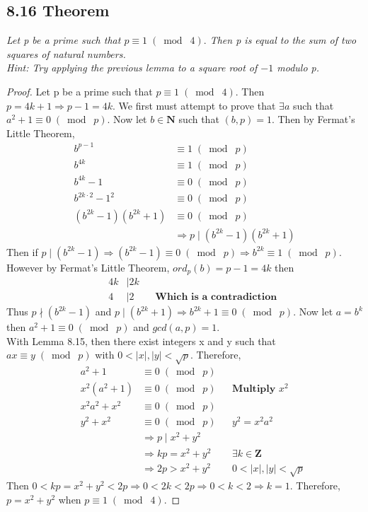 \documentclass{article}
\begin{document}
\subsection*{8.16 Theorem} 
\quad \textit{Let p be a prime such that $p \equiv 1 \;(\bmod\; 4).$ Then p is equal to the sum of two squares of natural numbers.}\\
\textit{Hint: Try applying the previous lemma to a square root of $-1$ modulo p.}

\begin{proof}
Let p be a prime such that $p \equiv 1 \;(\bmod\; 4)$. Then $p = 4k +1 \Longrightarrow p-1 = 4k$. We first must attempt to prove that $\exists a$ such that $a^2 + 1 \equiv 0 \;(\bmod\; p)$. Now let $b \in \mathbf{N}$ such that $(b,p) = 1$. Then by Fermat's Little Theorem,
\begin{align*}
    && b^{p-1}&\equiv 1 \;(\bmod\; p)&&\\
    && b^{4k}&\equiv 1 \;(\bmod\; p)&&\\
    && b^{4k} - 1 &\equiv 0 \;(\bmod\; p)&&\\
    && b^{2k\cdot 2} - 1^2 &\equiv 0 \;(\bmod\; p)&&\\
    && (b^{2k} - 1)(b^{2k} + 1) &\equiv 0 \;(\bmod\; p)&&\\
    && &\Longrightarrow p \mid (b^{2k} - 1)(b^{2k} + 1)&&
\end{align*}
Then if $p \mid (b^{2k} - 1) \Longrightarrow (b^{2k} - 1) \equiv 0 \;(\bmod\; p) \Longrightarrow b^{2k} \equiv 1 \;(\bmod\; p)$. However by Fermat's Little Theorem, $ord_p(b) = p-1 = 4k$ then 
\begin{align*}
    &&4k &\mid 2k &&\\
    &&4 &\mid 2 && \textbf{Which is a contradiction}
\end{align*}
Thus $p \nmid (b^{2k} - 1)$ and $p \mid (b^{2k} + 1) \Longrightarrow b^{2k}+1 \equiv 0 \;(\bmod\; p)$. Now let $a = b^{k}$ then $a^2+1 \equiv 0 \;(\bmod\; p)$ and $gcd(a, p) = 1$.\\
With Lemma 8.15, then there exist integers x and y such that $ax \equiv y \;(\bmod\; p)$ with $0 < |x|,|y| < \sqrt{p}$. Therefore,
\begin{align*}
    && a^2+1 &\equiv 0 \;(\bmod\; p) &&\\
    && x^2(a^2+1) &\equiv 0 \;(\bmod\; p) && \textbf{Multiply $x^2$}\\
    && x^2a^2+x^2 &\equiv 0 \;(\bmod\; p) &&\\
    && y^2+x^2 &\equiv 0 \;(\bmod\; p) && \textbf{$y^2 = x^2a^2$}\\
    && &\Longrightarrow p \mid x^2 + y^2 &&\\
    && &\Longrightarrow kp = x^2 + y^2 &&\exists k \in \mathbf{Z}\\
    && &\Longrightarrow 2p > x^2 + y^2 &&0 < |x|,|y| < \sqrt{p}
\end{align*}
Then $0 < kp = x^2 + y^2 < 2p \Longrightarrow 0 < 2k < 2p \Longrightarrow 0 < k < 2 \Longrightarrow k = 1$. Therefore, $p = x^2 + y^2$ when $p \equiv 1 \;(\bmod\; 4)$.
\end{proof}
\end{document}
